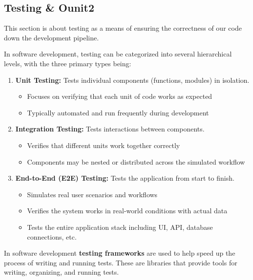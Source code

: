     \newpage 

    \subsection{Testing \& Ounit2}
    This section is about testing as a means of ensuring the correctness of our code down the development pipeline.

    \begin{Def}

        In software development, testing can be categorized into several hierarchical levels, with the three primary types being:
        
        \begin{enumerate}
            \item \textbf{Unit Testing:} Tests individual components (functions, modules) in isolation.
                        \begin{itemize}
                            \item Focuses on verifying that each unit of code works as expected
                            \item Typically automated and run frequently during development
                        \end{itemize}
                        
                        \item \textbf{Integration Testing:} Tests interactions between components.
                        \begin{itemize}
                            \item Verifies that different units work together correctly
                            \item Components may be nested or distributed across the simulated workflow
                        \end{itemize}
                        
                        \item \textbf{End-to-End (E2E) Testing:} Tests the application from start to finish.
                        \begin{itemize}
                            \item Simulates real user scenarios and workflows
                            \item Verifies the system works in real-world conditions with actual data
                            \item Tests the entire application stack including UI, API, database connections, etc.
                        \end{itemize}
        \end{enumerate}
        \noindent
        In software development \textbf{testing frameworks} are used to help speed up the process of writing and running tests.
        These are libraries that provide tools for writing, organizing, and running tests.
    \end{Def}
    
